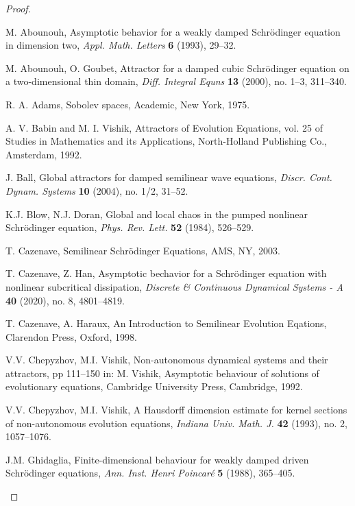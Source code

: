 \documentclass[11pt]{article}
\newcommand{\5}{{\hspace{0.5mm}}}
\numberwithin{equation}{section}
\numberwithin{equation}{section}
\begin{document}
\begin{proof}
\begin{thebibliography}{99}

M. Abounouh,
Asymptotic behavior for a weakly damped Schr\"odinger equation in dimension two, {\em Appl. Math. Letters} {\bf 6} (1993), 29--32.

M. Abounouh, O. Goubet,
Attractor for a damped cubic Schr\"odinger equation on a two-dimensional thin domain, {\em Diff. Integral Equns} {\bf 13} (2000), no. 1--3, 311--340.

R. A. Adams,
Sobolev spaces, Academic, New York, 1975.

 A. V. Babin and M. I. Vishik,
 Attractors of Evolution Equations, vol. 25 of Studies in Mathematics and its Applications, North-Holland Publishing Co., Amsterdam, 1992.

J. Ball,
Global attractors for damped semilinear wave equations, {\em Discr. Cont. Dynam. Systems} {\bf 10} (2004), no. 1/2, 31--52.

K.J. Blow, N.J. Doran,
Global and local chaos in the pumped nonlinear Schr\"odinger equation, {\em Phys. Rev. Lett.} {\bf 52} (1984), 526--529.


T. Cazenave,
Semilinear Schr\"odinger Equations, AMS, NY, 2003.

T. Cazenave, Z. Han, 
Asymptotic bechavior for a Schr\"odinger equation with nonlinear subcritical dissipation,
{\em
 Discrete \& Continuous Dynamical Systems - A} {\bf 40} (2020), no. 8, 4801--4819. 

T. Cazenave, A. Haraux, An Introduction to Semilinear Evolution Eqations,
Clarendon Press, Oxford, 1998.








V.V. Chepyzhov, M.I. Vishik,
Non-autonomous dynamical systems and their attractors, pp 111--150 in:
M. Vishik, Asymptotic behaviour of solutions of evolutionary equations, Cambridge University Press, Cambridge, 1992.

V.V. Chepyzhov, M.I. Vishik,
A Hausdorff dimension estimate for kernel sections of non-autonomous evolution equations,
 {\em Indiana Univ. Math. J.} {\bf 42} (1993), no. 2, 1057--1076.

J.M. Ghidaglia,
Finite-dimensional behaviour for weakly damped driven Schr\"odinger equations, {\em Ann. Inst. Henri Poincar\'e} {\bf 5} (1988), 365--405.


\end{thebibliography}
\end{proof}
\end{document}
